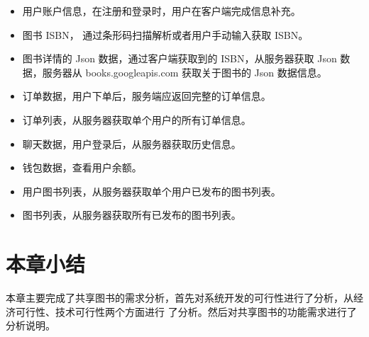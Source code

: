 \begin{itemize}
	\item 用户账户信息，在注册和登录时，用户在客户端完成信息补充。
	\item 图书 ISBN， 通过条形码扫描解析或者用户手动输入获取 ISBN。
	\item 图书详情的 Json 数据，通过客户端获取到的 ISBN，从服务器获取 Json 数据，服务器从 books.googleapis.com 获取关于图书的 Json 数据信息。
	\item 订单数据，用户下单后，服务端应返回完整的订单信息。
	\item 订单列表，从服务器获取单个用户的所有订单信息。
	\item 聊天数据，用户登录后，从服务器获取历史信息。
	\item 钱包数据，查看用户余额。
	\item 用户图书列表，从服务器获取单个用户已发布的图书列表。
	\item 图书列表，从服务器获取所有已发布的图书列表。
\end{itemize}

\section{本章小结}
本章主要完成了共享图书的需求分析，首先对系统开发的可行性进行了分析，从经济可行性、技术可行性两个方面进行
了分析。然后对共享图书的功能需求进行了分析说明。

